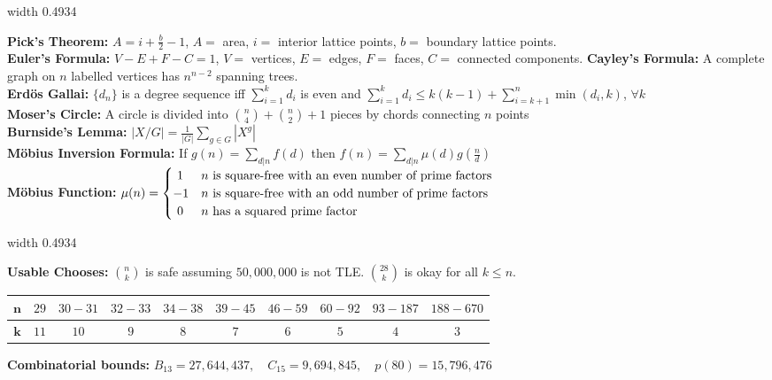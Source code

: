 \documentclass[a4paper,twocolumn]{article}
\newcommand\disappearingrule{%
	\par %
	\vskip5pt %
	\leaders\vrule width 0.4934\textwidth\vskip0.4pt %
	\nointerlineskip %
	\vskip2pt %
}
\begin{document}
{\disappearingrule

\textbf{Pick's Theorem: } $A = i + \frac{b}{2} - 1$, \textnormal{$A = $ area, $i = $ interior lattice points, $b = $ boundary lattice points.}\\
\textbf{Euler's Formula: } $V - E + F - C = 1$, \textnormal{$V = $ vertices, $E = $ edges, $F = $ faces, $C = $ connected components.}
\textbf{Cayley's Formula: } \textnormal{A complete graph on $n$ labelled vertices has $n^{n-2}$ spanning trees.}\\
\textbf{Erd\"os Gallai: } \textnormal{$\{ d_n \}$ is a degree sequence iff $\sum\limits_{i=1}^k d_i$ is even and $\sum\limits_{i=1}^k d_i \leq k(k-1) + \sum\limits_{i=k+1}^n \min(d_i,k)$, $\forall k$}\\
\textbf{Moser's Circle: } \textnormal{A circle is divided into $\binom{n}{4} + \binom{n}{2} + 1$ pieces by chords connecting $n$ points}\\[1ex]
\textbf{Burnside's Lemma: } $|X/G| = \frac{1}{|G|} \sum\limits_{g\in G} |X^g|$  \\
\textbf{M\"obius Inversion Formula: } \textnormal{If }$g(n) = \sum\limits_{d | n} f(d) $ \textnormal{ then } $f(n) = \sum\limits_{d | n} \mu(d) g\left(\frac{n}{d}\right)$ \\
\textbf{M\"obius Function: } $\mu(n) = \begin{cases}\ 1 & n \textnormal{ is square-free with an even number of prime factors} \\ -1 & n \textnormal{ is square-free with an odd number of prime factors} \\ \ 0 & n \textnormal{ has a squared prime factor}  \end{cases}$

\disappearingrule

\textbf{Usable Chooses: } \textnormal{$\binom{n}{k}$ is safe assuming $50,000,000$ is not TLE. $\binom{28}{k}$ is okay for all $k \leq n$.}  \\
\begin{tabular}{|c | c | c | c | c | c | c | c | c | c |}
	\hline
	$\mathbf{n}$ & $29$ & $30 - 31$ & $32 - 33$ & $34 - 38$ & $39 - 45$ & $46 - 59$ & $60 - 92$ & $93 - 187$ & $188 - 670$ \\
	\hline
	 $\mathbf{k}$ & $11$ &  $10$ &  $9$ &  $8$ &  $7$ &  $6$ &  $5$ &  $4$ &  $3$ \\
	\hline
\end{tabular}

\textbf{Combinatorial bounds: } $B_{13} = 27,644,437, \quad C_{15} = 9,694,845, \quad p(80) = 15,796,476$

}
\end{document}
